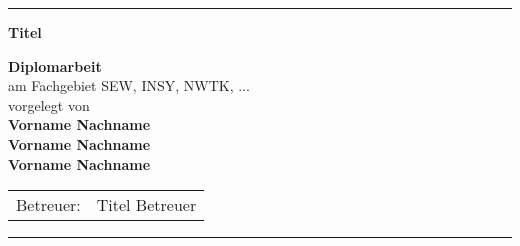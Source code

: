 
\newcommand{\trtitle}{Titel}
\newcommand{\trtype}{Diplomarbeit}
\newcommand{\trort}{Shkoder}
\newcommand{\trbetreuer}{Titel Betreuer}
\newcommand{\trfachgebiet}{SEW, INSY, NWTK, ...}
\newcommand{\trdate}{\today}

\thispagestyle{empty}


\rule{\textwidth}{0.4pt}

\vspace{2.5cm}
\begin{center}
  \textbf{\LARGE \trtitle}
\end{center}
\vspace{2cm}

\begin{center}
  \textbf{\trtype} \\
  am Fachgebiet \trfachgebiet \\
  \vspace{2.5cm}
  vorgelegt von \\
  \textbf{Vorname Nachname}\\
   \textbf{Vorname Nachname}\\
    \textbf{Vorname Nachname}
\end{center}

\vspace{1cm}


\begin{center}
\begin{tabular}{ll}
Betreuer: & \trbetreuer \\
\end{tabular}
\end{center}

\vfill


\rule{\textwidth}{0.4pt}
